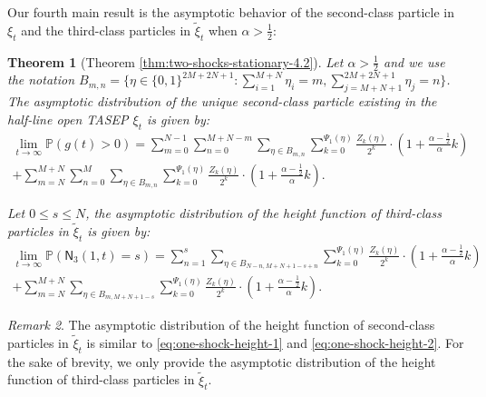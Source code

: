 \documentclass[12pt,a4paper]{amsart}
\newtheorem{theorem}{Theorem} %
\theoremstyle{remark}
\newtheorem{remark}[theorem]{Remark}
\numberwithin{equation}{section} \numberwithin{theorem}{section}
\begin{document}
Our fourth main result is the asymptotic behavior of the second-class particle in $\xi_t$ and the third-class particles in $\tilde{\xi}_{t}$ when $ \alpha > \frac12$:
\begin{theorem}[Theorem \ref{thm:two-shocks-stationary-4.2}]
Let $ \alpha > \frac12$ and we use the notation $B_{m,n}=\{\eta \in \{0,1\}^{2M+2N+1}: \sum_{i=1}^{M+N}\eta_i=m, \sum_{j=M+N+1}^{2M+2N+1}\eta_j=n\}$. The asymptotic distribution of the unique second-class particle existing in the half-line open TASEP $\xi_t$ is given by:
\begin{multline*}
\lim_{t\to\infty}\mathbb{P}(g(t)>0)=\sum_{m=0}^{N-1}\sum_{n=0}^{M+N-m}\sum_{\eta \in B_{m,n}} \sum_{k=0}^{\Psi_{1}(\eta)} \frac{Z_k(\eta)}{2^k} \cdot \left(1+\frac{\alpha-\frac12}{\alpha}k\right)  \\
+\sum_{m=N}^{M+N}\sum_{n=0}^{M}\sum_{\eta \in B_{m,n}}\sum_{k=0}^{\Psi_{1}(\eta)} \frac{Z_k(\eta)}{2^k} \cdot \left(1+\frac{\alpha-\frac12}{\alpha}k\right).
\end{multline*}

Let $0 \leq s \leq N$, the asymptotic distribution of the height function of third-class particles in $\tilde{\xi}_t$ is given by:
\begin{multline*}
\lim_{t\to\infty}\mathbb{P}(\mathsf{N}_{3} (1,t)=s)=\sum_{n=1}^{s}\sum_{\eta \in B_{N-n,M+N+1-s+n}} \sum_{k=0}^{\Psi_{1}(\eta)} \frac{Z_k(\eta)}{2^k} \cdot \left(1+\frac{\alpha-\frac12}{\alpha}k\right)  \\
+\sum_{m=N}^{M+N}\sum_{\eta \in B_{m,M+N+1-s}}\sum_{k=0}^{\Psi_{1}(\eta)} \frac{Z_k(\eta)}{2^k} \cdot \left(1+\frac{\alpha-\frac12}{\alpha}k\right).
\end{multline*}
\end{theorem}



\begin{remark}
The asymptotic distribution of the height function of second-class particles in $\tilde{\xi}_t$ is similar to \eqref{eq:one-shock-height-1} and \eqref{eq:one-shock-height-2}. For the
sake of brevity, we only provide the asymptotic distribution of the height function of third-class particles in $\tilde{\xi}_t$.
\end{remark}
\end{document}
